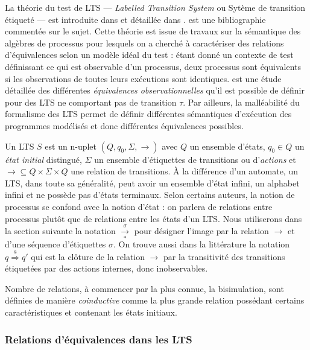 La th\'eorie du test de \textsf{LTS} --- \emph{Labelled Transition System} ou
Syt\`eme de transition \'etiquet\'e --- est introduite dans
\cite{auto-test-fm} et d\'etaill\'ee dans
\cite{thtretmans,thphalippou}. \cite{testtransbib} est 
une bibliographie comment\'ee sur le sujet. Cette th\'eorie est issue de travaux sur la s\'emantique des
alg\`ebres de processus pour lesquels on a cherch\'e \`a
caract\'eriser des relations d'\'equivalences selon un mod\`ele
id\'eal du test : \'etant donn\'e un contexte de test
d\'efinissant ce qui est observable d'un processus, deux processus
sont \'equivalents si les observations de toutes leurs ex\'ecutions
sont identiques.  \cite{sem-seq-proc} est une \'etude d\'etaill\'ee
des diff\'erentes \emph{\'equivalences observationnelles} qu'il est
possible de d\'efinir pour des LTS ne comportant pas de transition
$\tau$. Par ailleurs, la mall\'eabilit\'e du formalisme  des \textsf{LTS}
permet de d\'efinir diff\'erentes s\'emantiques d'ex\'ecution des
programmes mod\'elis\'es et donc diff\'erentes \'equivalences
possibles.


Un \textsf{LTS} $S$ est un n-uplet
$(Q,q_0,\Sigma,\rightarrow)$ avec $Q$ un ensemble d'\'etats, $q_0\in
Q$ un \emph{\'etat initial} distingu\'e, $\Sigma$ un ensemble
d'\'etiquettes de transitions ou d'\emph{actions} et $\rightarrow \subseteq Q\times{}
\Sigma\times{}Q$ une relation de transitions. \`A la diff\'erence d'un
automate, un \textsf{LTS}, dans toute sa g\'en\'eralit\'e, peut
avoir un ensemble d'\'etat infini, un alphabet infini et ne
poss\`ede pas d'\'etats terminaux. Selon certains auteurs, la notion
de processus se confond avec la notion d'\'etat : on parlera de
relations entre processus plut\^ot que de relations entre les \'etats
d'un \textsf{LTS}.  Nous utiliserons dans la section suivante la
notation $\xrightarrow[*]{\sigma}$ pour d\'esigner l'image par
la relation $\rightarrow$ et d'une s\'equence
d'\'etiquettes $\sigma$. 
On trouve aussi dans la litt\'erature la notation $q \stackrel{a}{\Rightarrow} q'$ qui
est la cl\^oture de la relation $\rightarrow$ par la transitivit\'e
des transitions \'etiquet\'ees par des actions internes, donc
inobservables. 

Nombre de relations, \`a commencer par la plus connue, la
bisimulation, sont d\'efinies  de mani\`ere \emph{coinductive}\cite{coalgebra-tutorial} comme
la plus grande relation poss\'edant certains caract\'eristiques
et contenant les \'etats initiaux.

\subsubsection{Relations d'\'equivalences dans les \textsf{LTS}}

